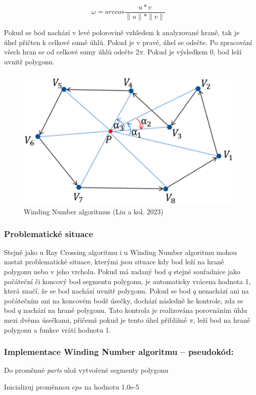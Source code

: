 \documentclass{article}
\begin{document}
\begin{spacing}{1.5}
$$\omega = arccos\frac{u*v}{\|u\|*\|v\|}$$

\vspace*{0.3cm}
Pokud se bod nachází v levé polorovině vzhledem k analyzované hraně, tak je úhel přičten k celkové sumě úhlů. Pokud je v pravé, úhel se odečte.
Po zpracování všech hran se od celkové sumy úhlů odečte 2$\pi$. Pokud je výsledkem 0, bod leží uvnitř polygonu.

\begin{figure}[h]
    \centering
    \includegraphics[width=0.7\linewidth]{images/wind.png}
    \caption{Winding Number algoritmus (Liu a kol. 2023)}
    \label{fig:enter-label}
\end{figure}

\subsubsection{Problematické situace}
Stejně jako u Ray Crossing algoritmu i u Winding Number algoritmu mohou nastat problematické situace, kterými jsou situace kdy bod leží na hraně polygonu nebo v jeho vrcholu. Pokud má zadaný bod $q$ stejné souřadnice jako počáteční či koncový bod segmentu polygonu, je automaticky vrácena hodnota 1, která značí, že se bod nachází uvnitř polygonu. Pokud se bod $q$ nenachází ani na počátečním ani na koncovém bodě úsečky, dochází následně ke kontrole, zda se bod $q$ nachází na hraně polygonu. Tato kontrola je realizována porovnáním úhlu mezi dvěma úsečkami, přičemž pokud je tento úhel přibližně $\pi$, leží bod na hraně polygonu a funkce vrátí hodnotu 1.

\subsubsection{Implementace Winding Number algoritmu – pseudokód:}
\noindent Do proměnné \textit{parts} ulož vytvořené segmenty polygonu

\noindent Inicializuj proměnnou $eps$ na hodnotu 1.0e-5


\end{spacing}
\end{document}
